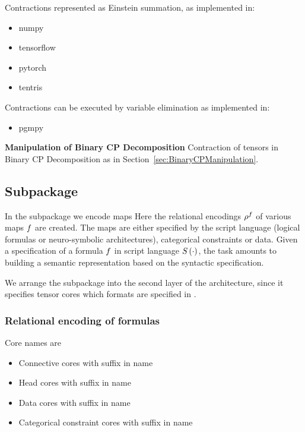 Contractions represented as Einstein summation, as implemented in:
\begin{itemize}
	\item numpy
	\item tensorflow
	\item pytorch
	\item tentris
\end{itemize}

Contractions can be executed by variable elimination as implemented in:
\begin{itemize}
	\item pgmpy
\end{itemize}

\textbf{Manipulation of Binary CP Decomposition}
Contraction of tensors in Binary CP Decomposition as in Section~\ref{sec:BinaryCPManipulation}.





\subsection{Subpackage \spencoding}

In the \spencoding subpackage we encode maps 
Here the relational encodings $\rho^{f}$ of various maps $f$ are created.
%
The maps are either specified by the script language (logical formulas or neuro-symbolic architectures), categorical constraints or data.
Given a specification of a formula $f$ in script language $S\left(\cdot\right)$, the task amounts to building a semantic representation based on the syntactic specification.

We arrange the \spencoding subpackage into the second layer of the \tnreason architecture, since it specifies tensor cores which formats are specified in \spengine.

\subsubsection{Relational encoding of formulas}

Core names are  %
\begin{itemize}
	\item Connective cores with suffix  in name
	\item Head cores with suffix  in name
	\item Data cores with suffix  in name
	\item Categorical constraint cores with suffix  in name
\end{itemize} 

